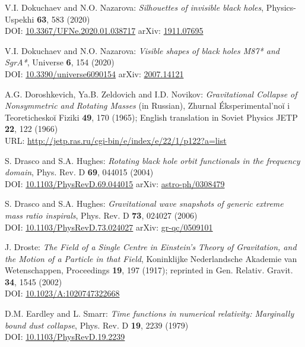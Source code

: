 \begin{thebibliography}{123}
V.I. Dokuchaev and N.O. Nazarova: {\em Silhouettes of invisible black holes},
Physics-Uspekhi {\bf 63}, 583 (2020)\\
DOI: \href{https://doi.org/10.3367/UFNe.2020.01.038717}{10.3367/UFNe.2020.01.038717}\hfill
arXiv: \href{https://arxiv.org/abs/1911.07695}{1911.07695}

V.I. Dokuchaev and N.O. Nazarova: {\em Visible shapes of black holes M87* and SgrA*},
Universe {\bf 6}, 154 (2020)\\
DOI: \href{https://doi.org/10.3390/universe6090154}{10.3390/universe6090154}\hfill
arXiv: \href{https://arxiv.org/abs/2007.14121}{2007.14121}

A.G. Doroshkevich, Ya.B. Zeldovich and I.D. Novikov:
{\em Gravitational Collapse of Nonsymmetric and Rotating Masses} (in Russian),
Zhurnal Éksperimental'noĭ i Teoreticheskoĭ Fiziki {\bf 49}, 170 (1965);
English translation in Soviet Physics JETP {\bf 22}, 122 (1966)\\
URL: \url{http://jetp.ras.ru/cgi-bin/e/index/e/22/1/p122?a=list}

S. Drasco and S.A. Hughes:
{\em Rotating black hole orbit functionals in the frequency domain},
Phys. Rev. D {\bf 69}, 044015 (2004)\\
DOI: \href{https://doi.org/10.1103/PhysRevD.69.044015}{10.1103/PhysRevD.69.044015}\hfill
arXiv: \href{https://arxiv.org/abs/astro-ph/0308479}{astro-ph/0308479}

S. Drasco and S.A. Hughes:
{\em Gravitational wave snapshots of generic extreme mass ratio inspirals},
Phys. Rev. D {\bf 73}, 024027 (2006)\\
DOI: \href{https://doi.org/10.1103/PhysRevD.73.024027}{10.1103/PhysRevD.73.024027}\hfill
arXiv: \href{https://arxiv.org/abs/gr-qc/0509101}{gr-qc/0509101}

J. Droste:
{\em The Field of a Single Centre in Einstein's Theory of Gravitation, and the Motion of a Particle in that Field},
Koninklijke Nederlandsche Akademie van Wetenschappen, Proceedings {\bf 19}, 197 (1917);
reprinted in Gen. Relativ. Gravit. {\bf 34}, 1545 (2002)\\
DOI: \href{https://doi.org/10.1023/A:1020747322668}{10.1023/A:1020747322668}

D.M. Eardley and L. Smarr:
{\em Time functions in numerical relativity: Marginally bound dust collapse},
Phys. Rev. D {\bf 19}, 2239 (1979)\\
DOI: \href{https://doi.org/10.1103/PhysRevD.19.2239}{10.1103/PhysRevD.19.2239}


\end{thebibliography}
